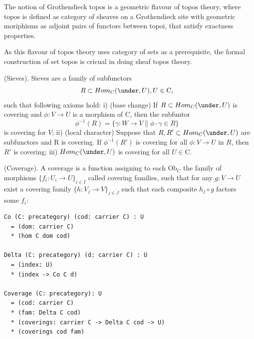 \begin{definition}
The notion of Grothendieck topos is a geometric flavour of topos theory,
where topos is defined as category of sheaves on a Grothendieck site with
geometric moriphisms as adjoint pairs of functors between topoi, that
satisfy exactness properties. \cite{Jardine15}

As this flavour of topos theory uses category of sets as a prerequisite,
the formal construction of set topos is cricual in doing sheaf topos theory.

\begin{definition} (Sieves).
Sieves are a family of subfunctors
$$\def\mapright#1{\xrightarrow{{#1}}}
  \def\mapdown#1{\Big\downarrow\rlap{\raise2pt{\scriptstyle{#1}}}}
  \def\mapdiagl#1{\vcenter{\searrow}\rlap{\raise2pt{\scriptstyle{#1}}}}
  \def\mapdiagr#1{\vcenter{\swarrow}\rlap{\raise2pt{\scriptstyle{#1}}}}
  R \subset Hom_C(\under,U), U \in \mathrm{C},
$$
such that following axioms hold: i) (base change) If $R \subset Hom_C(\under,U)$ is covering
and $\phi : V \rightarrow U$ is a morphism of $\mathrm{C}$, then the subfuntor
$$
   \phi^{-1}(R) = \{ \gamma : W \rightarrow V \| \phi \cdot \gamma \in R \}
$$
is covering for $V$; ii) (local character) Suppose that $R,R' \subset Hom_C(\under,U)$ are
subfunctors and R is covering. If $\phi^{-1}(R')$ is covering for
all $\phi : V \rightarrow U$ in $R$, then $R'$ is covering; iii)
$Hom_C(\under,U)$ is covering for all $U \in \mathrm{C}$.
\end{definition}

\begin{definition} (Coverage).
A coverage is a function assigning
to each $\mathrm{Ob}_C$ the family of morphisms $\{f_i : U_i \rightarrow U \}_{i\in I}$ called
covering families, such that for any $g: V \rightarrow U$ exist
a covering family $\{h:V_j \rightarrow V\}_{j \in J}$ such that
each composite $h_j \circ g$ factors some $f_i$:
\begin{lstlisting}
Co (C: precategory) (cod: carrier C) : U
  = (dom: carrier C)
  * (hom C dom cod)

Delta (C: precategory) (d: carrier C) : U
  = (index: U)
  * (index -> Co C d)

Coverage (C: precategory): U
  = (cod: carrier C)
  * (fam: Delta C cod)
  * (coverings: carrier C -> Delta C cod -> U)
  * (coverings cod fam)
\end{lstlisting}
\end{definition}


\end{definition}
